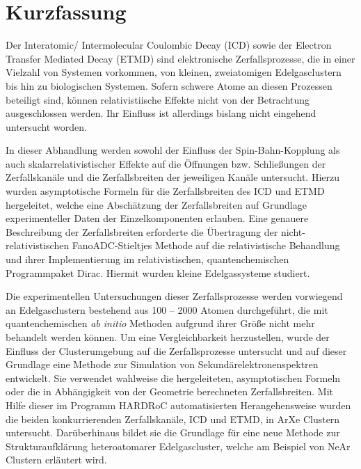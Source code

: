 \chapter*{Kurzfassung}
\thispagestyle{empty}

Der Interatomic/ Intermolecular Coulombic Decay (ICD) sowie der
Electron Transfer Mediated Decay (ETMD) sind elektronische Zerfallsprozesse,
die in einer Vielzahl von Systemen vorkommen, von kleinen, zweiatomigen
Edelgasclustern bis hin zu biologischen Systemen. Sofern schwere Atome
an diesen Prozessen beteiligt sind, können rela\-ti\-vis\-tii\-sche Effekte
nicht von der Betrachtung ausgeschlossen werden. Ihr Einfluss ist allerdings
bislang nicht eingehend untersucht worden.

In dieser Abhandlung werden sowohl der Einfluss der Spin-Bahn-Kopplung
als auch skalarrelativistischer Effekte auf die Öffnungen bzw.
Schließungen der Zerfallskanäle und die Zerfallsbreiten
der jeweiligen Kanäle untersucht.
Hierzu wurden asymptotische Formeln für die Zerfallsbreiten des ICD und ETMD
hergeleitet, welche eine Abschätzung der Zerfallsbreiten auf Grundlage
experimenteller Daten der Einzelkomponenten erlauben.
Eine genauere Beschreibung der Zerfallsbreiten erforderte die Übertragung
der nicht-relativistischen FanoADC-Stieltjes Methode auf die relativistische
Behandlung und ihrer Implementierung im relativistischen, quan\-ten\-chemi\-schen
Programmpaket Dirac. Hiermit wurden kleine Edelgassysteme studiert.

Die experimentellen Untersuchungen dieser Zerfallsprozesse werden vorwiegend an
Edelgasclustern bestehend aus 100 -- 2000 Atomen durchgeführt, die mit
quantenchemischen \emph{ab initio} Methoden aufgrund ihrer Größe
nicht mehr behandelt werden können.
Um eine Vergleichbarkeit herzustellen, wurde der Einfluss der Clusterumgebung
auf die Zerfallsprozesse untersucht und auf dieser Grundlage eine
Methode zur Simulation von Sekundärelektronenspektren entwickelt. Sie
verwendet wahlweise die hergeleiteten, asymptotischen Formeln oder die
in Abhängigkeit von der Geometrie berechneten Zerfallsbreiten. Mit Hilfe dieser
im Programm HARDRoC automatisierten Herangehensweise wurden die beiden
konkurrierenden
Zerfallskanäle, ICD und ETMD, in ArXe Clustern untersucht. Darüberhinaus
bildet sie die Grundlage für eine neue Methode zur Strukturaufklärung
heteroatomarer Edelgascluster, welche am Beispiel von NeAr Clustern
erläutert wird.
